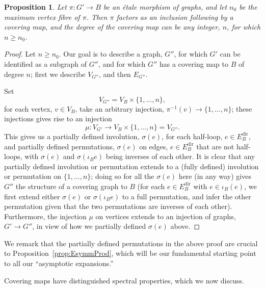 \documentclass{memo-l}
\theoremstyle{plain}
\newtheorem{proposition}[theorem]{Proposition}
\theoremstyle{definition}
\numberwithin{section}{chapter}
\numberwithin{equation}{chapter}
\newcommand{\from}{\colon}
\newcommand{\Edir}{E^{\mathrm{dir}}}
\theoremstyle{plain}
\theoremstyle{definition}
\begin{document}
\begin{proposition} 
\label{pr:etale_factorization}
Let $\pi\from G'\to B$ be an \'etale morphism
of graphs, and let $n_0$ be the 
maximum vertex fibre of $\pi$.
Then $\pi$ factors as an inclusion following by a covering
map, and the degree of the covering map can be any integer, $n$, for
which $n\ge n_0$.
\end{proposition}
\begin{proof}
Let $n\ge n_0$.
Our goal is to describe a graph, $G''$, for which $G'$ can be identified
as a subgraph of $G''$, and for which $G''$ has a covering map
to $B$ of degree $n$; first we describe $V_{G''}$, and then $E_{G''}$.

Set
$$
V_{G''} = V_B \times \{1,\ldots,n\},
$$
for each vertex, $v\in V_B$, take an arbitrary injection,
$\pi^{-1}(v) \to \{1,\ldots,n\}$; these injections
gives rise to an injection
$$
\mu\from V_{G'} \to  V_B \times \{1,\ldots,n\} = V_{G''}.
$$
This gives us a partially defined involution, $\sigma(e)$,
for each half-loop, $e\in \Edir_B$,
and partially defined
permutations, $\sigma(e)$ on edges, $e\in \Edir_B$ that are
not half-loops, with $\sigma(e)$ and $\sigma(\iota_B e)$ being
inverses of each other.
It is clear
that any partially defined involution or permutation 
extends to a (fully defined) involution or permutation on
$\{1,\ldots,n\}$; doing so for all the $\sigma(e)$ here (in
any way)
gives $G''$ the structure of a covering graph to $B$
(for each $e\in\Edir_B$ with $e\in \iota_B(e)$, we first extend
either $\sigma(e)$ or $\sigma(\iota_B e)$ to a full permutation,
and infer the other permutation given that the two permutations are
inverses of each other). 
Furthermore, the injection $\mu$ on vertices extends to an
injection of graphs, $G'\to G''$, in view of how we partially
defined $\sigma(e)$ above.
\end{proof}
We remark that the partially defined permutations in the above
proof are crucial to
Proposition~\ref{prop:EsymmProd}, which will be our fundamental
starting point to all our ``\glspl{asymptotic expansion}.''

Covering maps have distinguished spectral properties, which we now
discuss.
\end{document}
